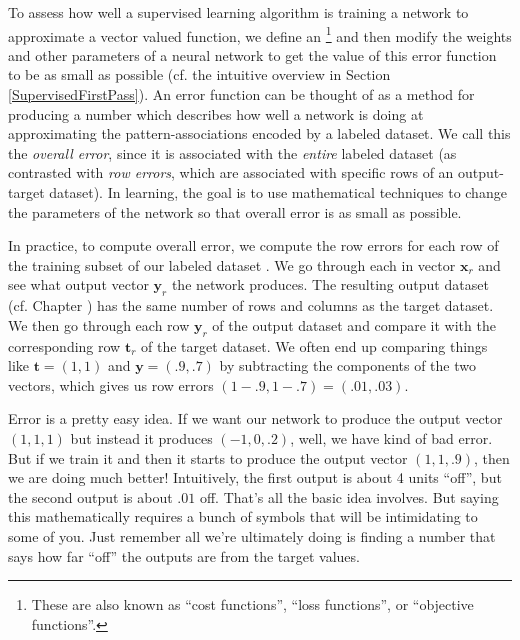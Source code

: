To assess how well a supervised learning algorithm is training a network to approximate a vector valued function, we  define an \footnote{These are also known as ``cost functions'', ``loss functions'', or ``objective functions''.} and then modify the weights and other parameters of a neural network to get the value of this error function to be as small as possible (cf. the intuitive overview in Section \ref{SupervisedFirstPass}). An error function can be thought of as a method for producing a number which describes how well a network is doing at approximating the pattern-associations encoded by a labeled dataset. We call this the \emph{overall error}, since it is associated with the \emph{entire} labeled dataset (as contrasted with \emph{row errors}, which are associated with specific rows of an output-target dataset). In learning, the goal is to use mathematical techniques to change the parameters of the network so that overall error is as small as possible.

In practice, to compute overall error, we compute the row errors for each row of the training subset of our labeled dataset . We go through each in vector $\mathbf{x}_r$ and see what output vector $\mathbf{y}_r$ the network produces. The resulting output dataset  (cf. Chapter ) has the same number of rows and columns as the target dataset. We then go through each row $\mathbf{y}_r$ of the output dataset and compare it with the corresponding row $\mathbf{t}_r$ of the target dataset. We often end up comparing things like $\mathbf{t}  =  (1,1)$ and $\mathbf{y}  =  (.9,.7)$ by subtracting the components of the two vectors, which gives us row errors $(1-.9,1-.7) = (.01,.03)$. 


Error is a pretty easy idea. If we want our network to produce the output vector $(1,1,1)$ but instead it produces $(-1,0,.2)$, well, we have kind of bad error. But if we train it and then it starts to produce the output vector $(1,1,.9)$, then we are doing much better! Intuitively, the first output is about 4 units ``off'', but the second output is about $.01$ off. That's all the basic idea involves. But saying this mathematically requires a bunch of symbols that will be intimidating to some of you. Just remember all we're ultimately doing is finding a number that says how far ``off'' the outputs are from the target values.


